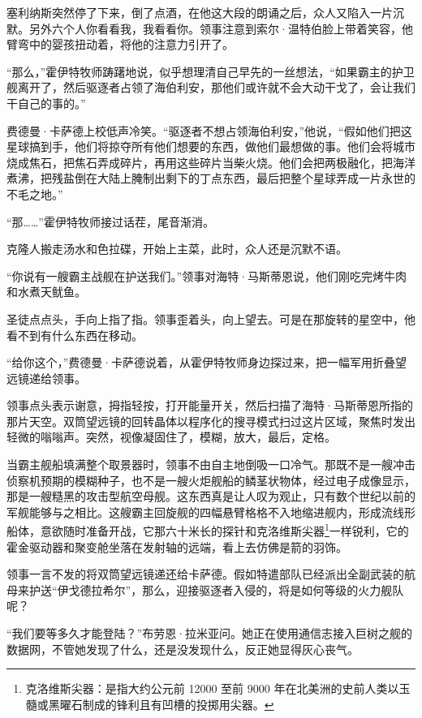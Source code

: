 \documentclass[AutoFakeBold=true]{book}
\begin{document}
塞利纳斯突然停了下来，倒了点酒，在他这大段的朗诵之后，众人又陷入一片沉默。另外六个人你看看我，我看看你。领事注意到索尔·温特伯脸上带着笑容，他臂弯中的婴孩扭动着，将他的注意力引开了。

``那么，''霍伊特牧师踌躇地说，似乎想理清自己早先的一丝想法，``如果霸主的护卫舰离开了，然后驱逐者占领了海伯利安，那他们或许就不会大动干戈了，会让我们干自己的事的。''

费德曼·卡萨德上校低声冷笑。``驱逐者不想占领海伯利安，''他说，``假如他们把这星球搞到手，他们将掠夺所有他们想要的东西，做他们最想做的事。他们会将城市烧成焦石，把焦石弄成碎片，再用这些碎片当柴火烧。他们会把两极融化，把海洋煮沸，把残盐倒在大陆上腌制出剩下的丁点东西，最后把整个星球弄成一片永世的不毛之地。''

``那……''霍伊特牧师接过话茬，尾音渐消。

克隆人搬走汤水和色拉碟，开始上主菜，此时，众人还是沉默不语。

\vspace*{1em}

``你说有一艘霸主战舰在护送我们。''领事对海特·马斯蒂恩说，他们刚吃完烤牛肉和水煮天鱿鱼。

圣徒点点头，手向上指了指。领事歪着头，向上望去。可是在那旋转的星空中，他看不到有什么东西在移动。

``给你这个，''费德曼·卡萨德说着，从霍伊特牧师身边探过来，把一幅军用折叠望远镜递给领事。

领事点头表示谢意，拇指轻按，打开能量开关，然后扫描了海特·马斯蒂恩所指的那片天空。双筒望远镜的回转晶体以程序化的搜寻模式扫过这片区域，聚焦时发出轻微的嗡嗡声。突然，视像凝固住了，模糊，放大，最后，定格。

当霸主舰船填满整个取景器时，领事不由自主地倒吸一口冷气。那既不是一艘冲击侦察机预期的模糊种子，也不是一艘火炬舰船的鳞茎状物体，经过电子成像显示，那是一艘糙黑的攻击型航空母舰。这东西真是让人叹为观止，只有数个世纪以前的军舰能够与之相比。这艘霸主回旋舰的四幅悬臂格格不入地缩进舰内，形成流线形船体，意欲随时准备开战，它那六十米长的探针和克洛维斯尖器\footnote{克洛维斯尖器：是指大约公元前 12000 至前 9000 年在北美洲的史前人类以玉髓或黑曜石制成的锋利且有凹槽的投掷用尖器。}一样锐利，它的霍金驱动器和聚变舱坐落在发射轴的远端，看上去仿佛是箭的羽饰。

领事一言不发的将双筒望远镜递还给卡萨德。假如特遣部队已经派出全副武装的航母来护送``伊戈德拉希尔''，那么，迎接驱逐者入侵的，将是如何等级的火力舰队呢？

``我们要等多久才能登陆？''布劳恩·拉米亚问。她正在使用通信志接入巨树之舰的数据网，不管她发现了什么，还是没发现什么，反正她显得灰心丧气。
\end{document}
